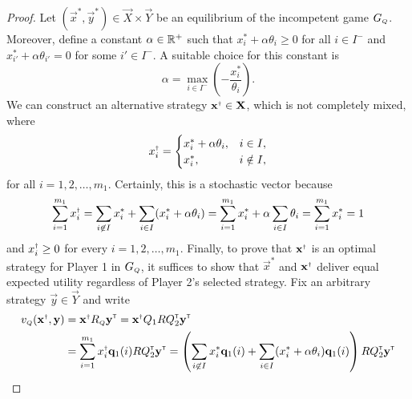 \begin{proof}
        Let $(\vec{x}^*, \vec{y}^*) \in \vec{X} \times \vec{Y}$ be an equilibrium of the incompetent game $G_\ms{Q}$.
        Moreover, define a constant $\alpha \in \mathbb{R}^+$ such that $x^*_i + \alpha \theta_i \ge 0$ for all $i \in I^-$ and $x^*_{i'} + \alpha \theta_{i'} = 0$ for some $i' \in I^-$.
        A suitable choice for this constant is
        \begin{equation} \label{temp:non-singular-incompetence-matrices-4}
            \alpha
                = \max_{i \in I^-} \left(-\frac{x_i^*}{\theta_i}\right).
        \end{equation}
        We can construct an alternative strategy $\vec{x}^\sdagger \in \vec{X}$, which is not completely mixed, where
        \begin{equation} \label{temp:non-singular-incompetence-matrices-5}
            x^\sdagger_i
                =
                \begin{cases}
                    x^*_i + \alpha \theta_i, & i \in I, \\
                    x^*_i, & i \notin I, \\
                \end{cases}
        \end{equation}
        for all $i = 1, 2, \ldots, m_1$.
        Certainly, this is a stochastic vector because
        \begin{equation}
            \sum_{i = 1}^{m_1} x^\sdagger_i
                = \sum_{i \not\in I} x^*_i + \sum_{i \in I} (x^*_i + \alpha \theta_i)
                = \sum_{i = 1}^{m_1} x^*_i + \alpha \sum_{i \in I} \theta_i
                = \sum_{i = 1}^{m_1} x^*_i
                = 1
        \end{equation}
        and $x^\sdagger_i \ge 0$ for every $i = 1, 2, \ldots, m_1$.
        Finally, to prove that $\vec{x}^\sdagger$ is an optimal strategy for Player 1 in $G_\ms{Q}$, it suffices to show that $\vec{x}^*$ and $\vec{x}^\sdagger$ deliver equal expected utility regardless of Player 2's selected strategy.
        Fix an arbitrary strategy $\vec{y} \in \vec{Y}$ and write
        \begin{equation}
        \begin{split}
            v_\ms{Q}(\vec{x}^\sdagger, \vec{y})
                & = \vec{x}^\sdagger R_\ms{Q} \vec{y}^\transp
                = \vec{x}^\sdagger Q_1 R Q_2^\transp \vec{y}^\transp \\
                & = \sum_{i = 1}^{m_1} x^\sdagger_i \vec{q}_1(i) R Q_2^\transp \vec{y}^\transp
                = \left(\sum_{i \not\in I} x^*_i \vec{q}_1(i) + \sum_{i \in I} (x^*_i + \alpha \theta_i) \vec{q}_1(i) \right) R Q_2^\transp \vec{y}^\transp \\

\end{split}
\end{equation}
\end{proof}
